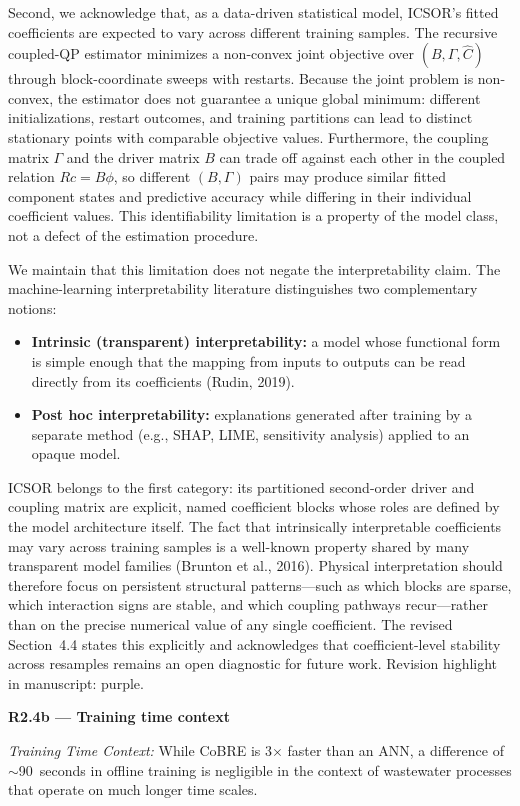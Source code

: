 \documentclass[a4paper,11pt]{article}
\newcommand{\reviewlabel}[1]{\noindent\textbf{\textcolor{accentblue}{#1}}\par\medskip}
\newcommand{\revhighlight}[2]{\textcolor{#1}{Revision highlight in manuscript: #2.}}
\begin{document}
Second, we acknowledge that, as a data-driven statistical model, ICSOR's fitted coefficients are expected to vary across different training samples. The recursive coupled-QP estimator minimizes a non-convex joint objective over $(B, \Gamma, \widehat{C})$ through block-coordinate sweeps with restarts. Because the joint problem is non-convex, the estimator does not guarantee a unique global minimum: different initializations, restart outcomes, and training partitions can lead to distinct stationary points with comparable objective values. Furthermore, the coupling matrix $\Gamma$ and the driver matrix $B$ can trade off against each other in the coupled relation $Rc = B\phi$, so different $(B, \Gamma)$ pairs may produce similar fitted component states and predictive accuracy while differing in their individual coefficient values. This identifiability limitation is a property of the model class, not a defect of the estimation procedure.

We maintain that this limitation does not negate the interpretability claim. The machine-learning interpretability literature distinguishes two complementary notions:
\begin{itemize}[nosep]
\item \textbf{Intrinsic (transparent) interpretability:} a model whose functional form is simple enough that the mapping from inputs to outputs can be read directly from its coefficients (Rudin, 2019).
\item \textbf{Post hoc interpretability:} explanations generated after training by a separate method (e.g., SHAP, LIME, sensitivity analysis) applied to an opaque model.
\end{itemize}
ICSOR belongs to the first category: its partitioned second-order driver and coupling matrix are explicit, named coefficient blocks whose roles are defined by the model architecture itself. The fact that intrinsically interpretable coefficients may vary across training samples is a well-known property shared by many transparent model families (Brunton et al., 2016). Physical interpretation should therefore focus on persistent structural patterns---such as which blocks are sparse, which interaction signs are stable, and which coupling pathways recur---rather than on the precise numerical value of any single coefficient. The revised Section~4.4 states this explicitly and acknowledges that coefficient-level stability across resamples remains an open diagnostic for future work. \revhighlight{revRtwoOne}{purple}

\reviewlabel{R2.4b --- Training time context}
\begin{reviewbox}
\textit{Training Time Context:} While CoBRE is 3$\times$ faster than an ANN, a difference of $\sim$90~seconds in offline training is negligible in the context of wastewater processes that operate on much longer time scales.
\end{reviewbox}
\end{document}
